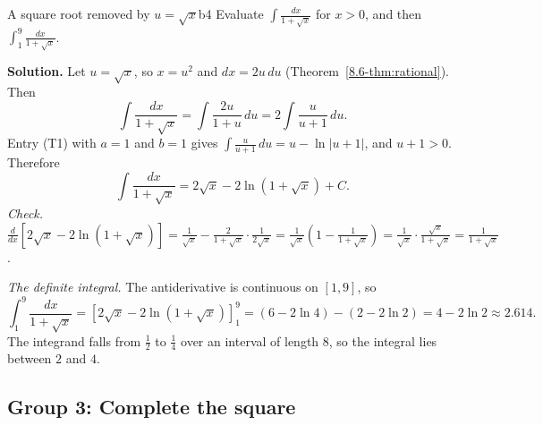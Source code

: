 \documentclass[11pt]{article}
\begin{document}
\begin{exmp}{A square root removed by $u=\sqrt x$}{b4}
Evaluate $\displaystyle\int\frac{dx}{1+\sqrt x}$ for $x>0$, and then $\displaystyle\int_1^9\frac{dx}{1+\sqrt x}$.

\textbf{Solution.} Let $u=\sqrt x$, so $x=u^2$ and $dx=2u\,du$ (Theorem~\ref{8.6-thm:rational}). Then
\[\int\frac{dx}{1+\sqrt x}=\int\frac{2u}{1+u}\,du=2\int\frac{u}{u+1}\,du .\]
Entry (T1) with $a=1$ and $b=1$ gives $\int\frac u{u+1}\,du=u-\ln\lvert u+1\rvert$, and $u+1>0$. Therefore
\[\int\frac{dx}{1+\sqrt x}=2\sqrt x-2\ln\left(1+\sqrt x\right)+C .\]
\emph{Check.} $\frac d{dx}\left[2\sqrt x-2\ln\left(1+\sqrt x\right)\right]=\frac1{\sqrt x}-\frac2{1+\sqrt x}\cdot\frac1{2\sqrt x}=\frac1{\sqrt x}\left(1-\frac1{1+\sqrt x}\right)=\frac1{\sqrt x}\cdot\frac{\sqrt x}{1+\sqrt x}=\frac1{1+\sqrt x}$.

\emph{The definite integral.} The antiderivative is continuous on $[1,9]$, so
\[\int_1^9\frac{dx}{1+\sqrt x}=\left[2\sqrt x-2\ln\left(1+\sqrt x\right)\right]_1^9=(6-2\ln4)-(2-2\ln2)=4-2\ln2\approx2.614 .\]
The integrand falls from $\frac12$ to $\frac14$ over an interval of length $8$, so the integral lies between $2$ and $4$.
\end{exmp}

\subsection*{Group 3: Complete the square}
\end{document}
